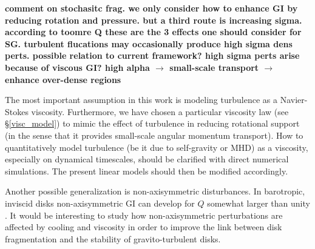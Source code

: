 {\bf comment on stochasitc frag. we only consider 
how to enhance GI by reducing rotation and pressure. but a third route is 
increasing sigma. according to toomre Q these are the 3 effects one should consider
for SG. turbulent flucations may occasionally produce high sigma dens perts. 
possible relation to current framework? high sigma perts arise because of viscous GI? 
high alpha $\to$ small-scale transport $\to$ enhance over-dense regions}





The most important assumption in this work is modeling turbulence as a  
Navier-Stokes viscosity. Furthermore, we have chosen a particular  
viscosity law (see \S\ref{visc_model}) to mimic the effect of 
turbulence in reducing rotational support (in the sense that it
provides small-scale angular momentum transport). 
How to quantitatively model turbulence (be it due to self-gravity or
MHD) as a viscosity, especially on dynamical timescales, should be
clarified with direct numerical simulations. The present linear models
should then be modified accordingly. 

Another possible generalization is non-axisymmetric
disturbances. In barotropic, inviscid disks  
non-axisymmetric GI can develop for $Q$ somewhat larger than unity
\citep{papaloizou89,papaloizou91}. It would be interesting to study
how non-axisymmetric perturbations are affected by cooling and
viscosity in order to improve %
the link between disk fragmentation and the
stability of gravito-turbulent disks.   




